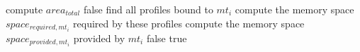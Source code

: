 \setlength{\textfloatsep}{0.2cm}
\begin{algorithm2e}[h]
		compute $area_{total}$\;
		{
			\Return false\;
		}
		{
				{
					find all profiles bound to $mt_{i}$\;
					compute the memory space $space_{required,mt_{i}}$ required by these profiles\;
					compute the memory space $space_{provided,mt_{i}}$ provided by $mt_{i}$\;
					{
						\Return false\;
					}
				}
				\Return true\;
		}
	\caption{$ConstraintsCheck()$}
	\label{algo:constrain_check_1}
\end{algorithm2e}
\setlength{\textfloatsep}{0.2cm}